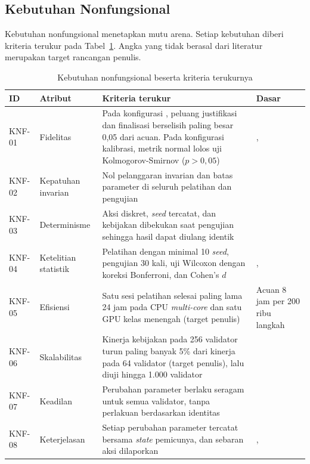 \subsection{Kebutuhan Nonfungsional}
\label{subsec:kebutuhan_nonfungsional}
Kebutuhan nonfungsional menetapkan mutu arena. Setiap kebutuhan diberi kriteria terukur pada Tabel~\ref{tab:kebutuhan_nonfungsional}. Angka yang tidak berasal dari literatur merupakan target rancangan penulis.

\begin{table}[htbp]
\centering
\caption{Kebutuhan nonfungsional beserta kriteria terukurnya}
\label{tab:kebutuhan_nonfungsional}
\small
\begin{tabular}{|p{1.3cm}|p{2.3cm}|p{5.7cm}|p{2.9cm}|}
\hline
\textbf{ID} & \textbf{Atribut} & \textbf{Kriteria terukur} & \textbf{Dasar} \\
\hline
KNF-01 & Fidelitas & Pada konfigurasi \textcite{laneve2025stochastic}, peluang justifikasi dan finalisasi berselisih paling besar 0,05 dari acuan. Pada konfigurasi kalibrasi, metrik normal lolos uji Kolmogorov-Smirnov ($p > 0{,}05$) & \textcite{laneve2025stochastic}, \textcite{skowronski2026adaptive} \\
\hline
KNF-02 & Kepatuhan invarian & Nol pelanggaran invarian dan batas parameter di seluruh pelatihan dan pengujian & \textcite{skowronski2026adaptive} \\
\hline
KNF-03 & Determinisme & Aksi diskret, \textit{seed} tercatat, dan kebijakan dibekukan saat pengujian sehingga hasil dapat diulang identik & \textcite{skowronski2026adaptive} \\
\hline
KNF-04 & Ketelitian statistik & Pelatihan dengan minimal 10 \textit{seed}, pengujian 30 kali, uji Wilcoxon dengan koreksi Bonferroni, dan Cohen's $d$ & \textcite{wushishi2026coadam}, \textcite{skowronski2026adaptive} \\
\hline
KNF-05 & Efisiensi & Satu sesi pelatihan selesai paling lama 24 jam pada CPU \textit{multi-core} dan satu GPU kelas menengah (target penulis) & Acuan 8 jam per 200 ribu langkah \parencite{skowronski2026adaptive} \\
\hline
KNF-06 & Skalabilitas & Kinerja kebijakan pada 256 validator turun paling banyak 5\% dari kinerja pada 64 validator (target penulis), lalu diuji hingga 1.000 validator & \textcite{wushishi2026coadam} \\
\hline
KNF-07 & Keadilan & Perubahan parameter berlaku seragam untuk semua validator, tanpa perlakuan berdasarkan identitas & \textcite{rizal2025enhancing} \\
\hline
KNF-08 & Keterjelasan & Setiap perubahan parameter tercatat bersama \textit{state} pemicunya, dan sebaran aksi dilaporkan & \textcite{skowronski2026adaptive}, \textcite{rizal2025enhancing} \\
\hline
\end{tabular}
\end{table}

